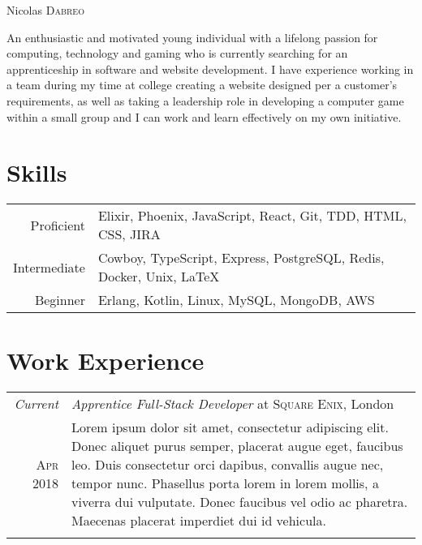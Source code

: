 \documentclass[a4paper,10pt]{article}
\begin{document}
\par{\raggedleft
		{\Huge Nicolas \textsc{Dabreo}
	}\bigskip\par}


\vspace{30pt}

\centering
An enthusiastic and motivated young individual with a lifelong passion for computing, technology and
gaming who is currently searching for an apprenticeship in software and website development. I have
experience working in a team during my time at college creating a website designed per a customer’s
requirements, as well as taking a leadership role in developing a computer game within a small group
and I can work and learn effectively on my own initiative.

\vspace{10pt}

\section{Skills}

\begin{tabular}{rl}
    Proficient & Elixir, Phoenix, JavaScript, React, Git, TDD, HTML, CSS, JIRA \\
    Intermediate & Cowboy, TypeScript, Express, PostgreSQL, Redis, Docker, Unix, \LaTeX \\
    Beginner & Erlang, Kotlin, Linux, MySQL, MongoDB, AWS \\
\end{tabular}

\section{Work Experience}

\begin{tabular}{r|p{11cm}}
    \emph{Current} & \textit{Apprentice Full-Stack Developer} at \textsc{Square Enix}, London\\
    \textsc{Apr 2018} &\footnotesize{Lorem ipsum dolor sit amet, consectetur adipiscing elit. Donec aliquet purus semper, placerat augue eget, faucibus leo. Duis consectetur orci dapibus, convallis augue nec, tempor nunc. Phasellus porta lorem in lorem mollis, a viverra dui vulputate. Donec faucibus vel odio ac pharetra. Maecenas placerat imperdiet dui id vehicula.}\\
    \multicolumn{2}{c}{} \\
\end{tabular}
\end{document}

